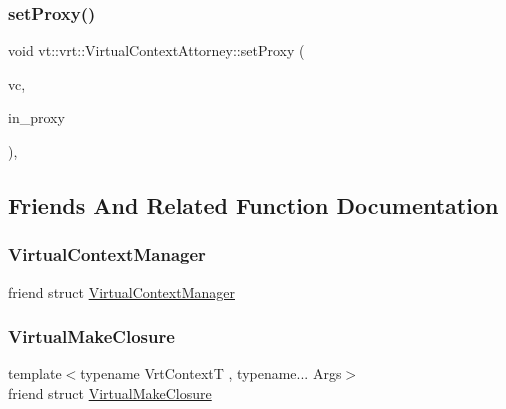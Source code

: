 \subsubsection{\texorpdfstring{set\+Proxy()}{setProxy()}}
{\footnotesize\ttfamily void vt\+::vrt\+::\+Virtual\+Context\+Attorney\+::set\+Proxy (\begin{DoxyParamCaption}\item[{\hyperlink{structvt_1_1vrt_1_1_virtual_context}{Virtual\+Context} $\ast$}]{vc,  }\item[{\hyperlink{namespacevt_a1b417dd5d684f045bb58a0ede70045ac}{Virtual\+Proxy\+Type}}]{in\+\_\+proxy }\end{DoxyParamCaption})\hspace{0.3cm}{\ttfamily [static]}, {\ttfamily [private]}}



\subsection{Friends And Related Function Documentation}
\mbox{\label{structvt_1_1vrt_1_1_virtual_context_attorney_a93a95e040b1875a105c62f3465731412}} 
\subsubsection{\texorpdfstring{Virtual\+Context\+Manager}{VirtualContextManager}}
{\footnotesize\ttfamily friend struct \hyperlink{structvt_1_1vrt_1_1_virtual_context_manager}{Virtual\+Context\+Manager}\hspace{0.3cm}{\ttfamily [friend]}}

\mbox{\label{structvt_1_1vrt_1_1_virtual_context_attorney_a6d27b32cd35d056a4d8bf6ba43f28f62}} 
\subsubsection{\texorpdfstring{Virtual\+Make\+Closure}{VirtualMakeClosure}}
{\footnotesize\ttfamily template$<$typename Vrt\+ContextT , typename... Args$>$ \\
friend struct \hyperlink{structvt_1_1vrt_1_1_virtual_make_closure}{Virtual\+Make\+Closure}\hspace{0.3cm}{\ttfamily [friend]}}




